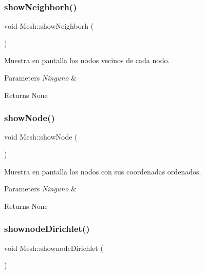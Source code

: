 \subsubsection{\texorpdfstring{show\+Neighborh()}{showNeighborh()}}
{\footnotesize\ttfamily void Mesh\+::show\+Neighborh (\begin{DoxyParamCaption}{ }\end{DoxyParamCaption})}



Muestra en pantalla los nodos vecinos de cada nodo. 


\begin{DoxyParams}{Parameters}
{\em Ninguno} & \\
\hline
\end{DoxyParams}
\begin{DoxyReturn}{Returns}
None 
\end{DoxyReturn}
\hypertarget{class_mesh_ac5eb1247da3ed432323f1dd8aebbf554}{}\label{class_mesh_ac5eb1247da3ed432323f1dd8aebbf554} 
\subsubsection{\texorpdfstring{show\+Node()}{showNode()}}
{\footnotesize\ttfamily void Mesh\+::show\+Node (\begin{DoxyParamCaption}{ }\end{DoxyParamCaption})}



Muestra en pantalla los nodos con sus coordenadas ordenados. 


\begin{DoxyParams}{Parameters}
{\em Ninguno} & \\
\hline
\end{DoxyParams}
\begin{DoxyReturn}{Returns}
None 
\end{DoxyReturn}
\hypertarget{class_mesh_a01bf98587a47624696aa808efac92ad8}{}\label{class_mesh_a01bf98587a47624696aa808efac92ad8} 
\subsubsection{\texorpdfstring{shownode\+Dirichlet()}{shownodeDirichlet()}}
{\footnotesize\ttfamily void Mesh\+::shownode\+Dirichlet (\begin{DoxyParamCaption}{ }\end{DoxyParamCaption})}



